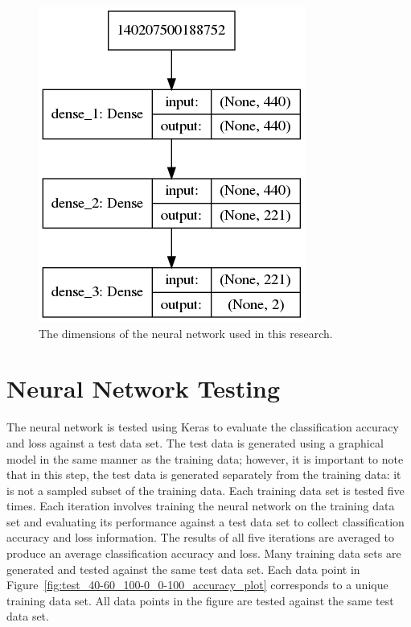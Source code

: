 \documentclass[paper=a4paper]{report}
\begin{document}
\begin{figure}[h]
    \centering
    \includegraphics[scale=0.5]{figures/neural_network_model.png}
    \caption[]{The dimensions of the neural network used in this research.}
    \label{fig:neural_network_model}
\end{figure}

\FloatBarrier
\section{Neural Network Testing}

The neural network is tested using Keras to evaluate the classification accuracy and loss against a
test data set. The test data is generated using a graphical model in the same manner as the training
data; however, it is important to note that in this step, the test data is generated separately from
the training data: it is not a sampled subset of the training data. Each training data set is tested
five times. Each iteration involves training the neural network on the training data set and
evaluating its performance against a test data set to collect classification accuracy and loss
information. The results of all five iterations are averaged to produce an average classification
accuracy and loss. Many training data sets are generated and tested against the same test data set.
Each data point in Figure~\ref{fig:test_40-60_100-0_0-100_accuracy_plot} corresponds to a unique
training data set. All data points in the figure are tested against the same test data set.
\end{document}
